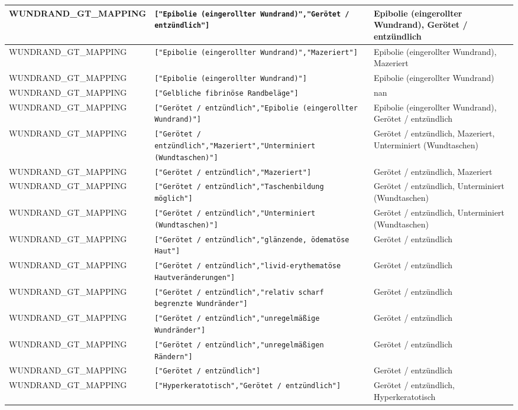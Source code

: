 \begin{longtable}{|p{3.5cm}|p{5cm}|p{6.5cm}|}
WUNDRAND\_GT\_MAPPING & \texttt{["Epibolie (eingerollter Wundrand)","Gerötet / entzündlich"]} & Epibolie (eingerollter Wundrand), Gerötet / entzündlich \\ \hline
WUNDRAND\_GT\_MAPPING & \texttt{["Epibolie (eingerollter Wundrand)","Mazeriert"]} & Epibolie (eingerollter Wundrand), Mazeriert \\ \hline
WUNDRAND\_GT\_MAPPING & \texttt{["Epibolie (eingerollter Wundrand)"]} & Epibolie (eingerollter Wundrand) \\ \hline
WUNDRAND\_GT\_MAPPING & \texttt{["Gelbliche fibrinöse Randbeläge"]} & nan \\ \hline
WUNDRAND\_GT\_MAPPING & \texttt{["Gerötet / entzündlich","Epibolie (eingerollter Wundrand)"]} & Epibolie (eingerollter Wundrand), Gerötet / entzündlich \\ \hline
WUNDRAND\_GT\_MAPPING & \texttt{["Gerötet / entzündlich","Mazeriert","Unterminiert (Wundtaschen)"]} & Gerötet / entzündlich, Mazeriert, Unterminiert (Wundtaschen) \\ \hline
WUNDRAND\_GT\_MAPPING & \texttt{["Gerötet / entzündlich","Mazeriert"]} & Gerötet / entzündlich, Mazeriert \\ \hline
WUNDRAND\_GT\_MAPPING & \texttt{["Gerötet / entzündlich","Taschenbildung möglich"]} & Gerötet / entzündlich, Unterminiert (Wundtaschen) \\ \hline
WUNDRAND\_GT\_MAPPING & \texttt{["Gerötet / entzündlich","Unterminiert (Wundtaschen)"]} & Gerötet / entzündlich, Unterminiert (Wundtaschen) \\ \hline
WUNDRAND\_GT\_MAPPING & \texttt{["Gerötet / entzündlich","glänzende, ödematöse Haut"]} & Gerötet / entzündlich \\ \hline
WUNDRAND\_GT\_MAPPING & \texttt{["Gerötet / entzündlich","livid-erythematöse Hautveränderungen"]} & Gerötet / entzündlich \\ \hline
WUNDRAND\_GT\_MAPPING & \texttt{["Gerötet / entzündlich","relativ scharf begrenzte Wundränder"]} & Gerötet / entzündlich \\ \hline
WUNDRAND\_GT\_MAPPING & \texttt{["Gerötet / entzündlich","unregelmäßige Wundränder"]} & Gerötet / entzündlich \\ \hline
WUNDRAND\_GT\_MAPPING & \texttt{["Gerötet / entzündlich","unregelmäßigen Rändern"]} & Gerötet / entzündlich \\ \hline
WUNDRAND\_GT\_MAPPING & \texttt{["Gerötet / entzündlich"]} & Gerötet / entzündlich \\ \hline
WUNDRAND\_GT\_MAPPING & \texttt{["Hyperkeratotisch","Gerötet / entzündlich"]} & Gerötet / entzündlich, Hyperkeratotisch \\ \hline

\end{longtable}
